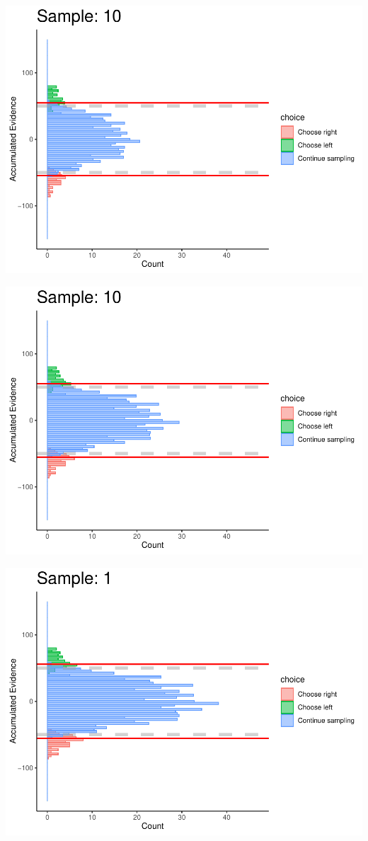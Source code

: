 \documentclass[
]{book}
\begin{document}
\begin{center}\includegraphics[width=0.8\linewidth]{LateNightBayes_files/figure-latex/fixed_dcb-97} \end{center}

\begin{center}\includegraphics[width=0.8\linewidth]{LateNightBayes_files/figure-latex/fixed_dcb-98} \end{center}

\begin{center}\includegraphics[width=0.8\linewidth]{LateNightBayes_files/figure-latex/fixed_dcb-99} \end{center}
\end{document}
